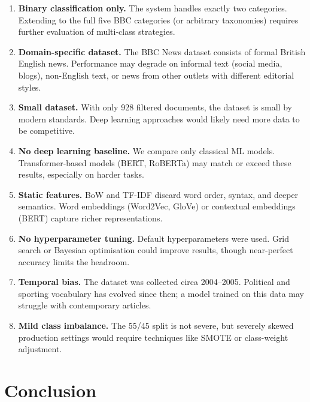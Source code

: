 \documentclass[conference, 10pt]{IEEEtran}
\begin{document}
\begin{enumerate}
  \item \textbf{Binary classification only.}  
  The system handles exactly two categories.  Extending to the full five BBC categories (or arbitrary taxonomies) requires further evaluation of multi-class strategies.

  \item \textbf{Domain-specific dataset.}  
  The BBC News dataset consists of formal British English news.  Performance may degrade on informal text (social media, blogs), non-English text, or news from other outlets with different editorial styles.

  \item \textbf{Small dataset.}  
  With only 928 filtered documents, the dataset is small by modern standards.  Deep learning approaches would likely need more data to be competitive.

  \item \textbf{No deep learning baseline.}  
  We compare only classical ML models.  Transformer-based models (BERT, RoBERTa) may match or exceed these results, especially on harder tasks.

  \item \textbf{Static features.}  
  BoW and TF-IDF discard word order, syntax, and deeper semantics.  Word embeddings (Word2Vec, GloVe) or contextual embeddings (BERT) capture richer representations.

  \item \textbf{No hyperparameter tuning.}  
  Default hyperparameters were used.  Grid search or Bayesian optimisation could improve results, though near-perfect accuracy limits the headroom.

  \item \textbf{Temporal bias.}  
  The dataset was collected circa 2004--2005.  Political and sporting vocabulary has evolved since then; a model trained on this data may struggle with contemporary articles.

  \item \textbf{Mild class imbalance.}  
  The 55/45 split is not severe, but severely skewed production settings would require techniques like SMOTE or class-weight adjustment.
\end{enumerate}


\section{Conclusion}
\label{sec:conclusion}
\end{document}
